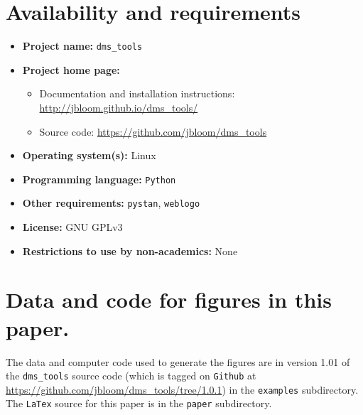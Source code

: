 \documentclass[twocolumn]{bmcart}%
\begin{document}
\section*{Availability and requirements}
\begin{itemize}
\item {\bf Project name:} \texttt{dms\_tools}
\item {\bf Project home page:}
\begin{itemize} 
\item Documentation and installation instructions: \url{http://jbloom.github.io/dms_tools/} 
\item Source code: \url{https://github.com/jbloom/dms_tools} 
\end{itemize}
\item {\bf Operating system(s):} Linux
\item {\bf Programming language:} \texttt{Python}
\item {\bf Other requirements:} \texttt{pystan}, \texttt{weblogo}
\item {\bf License:} GNU GPLv3
\item {\bf Restrictions to use by non-academics:} None
\end{itemize}

\section*{Data and code for figures in this paper.}
The data and computer code used to generate the figures are in version 1.01 of the \texttt{dms\_tools} source code (which is tagged on \texttt{Github} at \url{https://github.com/jbloom/dms_tools/tree/1.0.1}) in the \texttt{examples} subdirectory. The \texttt{LaTex} source for this paper is in the \texttt{paper} subdirectory.

\end{document}
